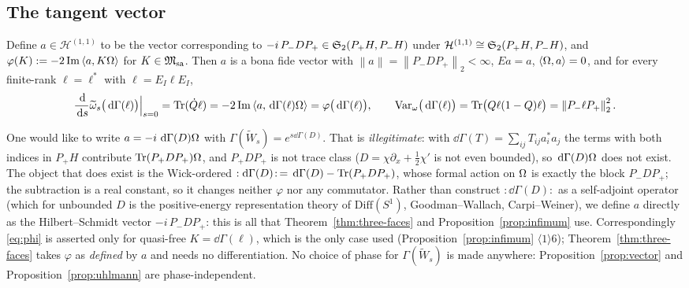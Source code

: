 \documentclass[11pt]{article}
\newcommand{\Pp}{P_+}\newcommand{\Pm}{P_-}
\newcommand{\Wt}{\widetilde W}\newcommand{\kt}{\widetilde k}
\newcommand{\Gm}{\Gamma}
\newcommand{\norm}[1]{\left\lVert #1\right\rVert}\newcommand{\abs}[1]{\left|#1\right|}
\newcommand{\ip}[2]{\left\langle #1,#2\right\rangle}\newcommand{\one}{\mathbf 1}
\newcommand{\Msa}{\cM_{\mathrm{sa}}}\newcommand{\Mpsa}{\cM'_{\mathrm{sa}}}
\begin{document}
\subsection{The tangent vector}
\begin{lemma}\label{lem:tangentvec}
Define $a\in\mathcal H^{(1,1)}$ to be the vector corresponding to $-i\,\Pm D\Pp\in
\Stwo(\Pp H,\Pm H)$ under $\mathcal H^{(1,1)}\cong\Stwo(\Pp H,\Pm H)$, and
$\varphi(K):=-2\operatorname{Im}\ip a{K\Om}$ for $K\in\Msa$.  Then $a$ is a bona fide vector with
$\norm a=\norm{\Pm D\Pp}_2<\infty$, $Ea=a$, $\ip\Om a=0$, and for every finite-rank $\ell=\ell^*$
with $\ell=E_I\ell E_I$,
\begin{equation}\label{eq:phi}
 \frac{\dd}{\dd s}\widetilde\omega_s\bigl(\dd\Gm(\ell)\bigr)\Big|_{s=0}
 =\Tr(\dot Q\ell)=-2\operatorname{Im}\ip a{\dd\Gm(\ell)\Om}=\varphi\bigl(\dd\Gm(\ell)\bigr),
 \qquad
 \Var_\omega\bigl(\dd\Gm(\ell)\bigr)=\Tr\bigl(Q\ell(1-Q)\ell\bigr)=\norm{\Pm\ell\Pp}_2^2 .
\end{equation}
\end{lemma}
\begin{remark}\label{rem:normalorder}
One would like to write $a=-i\,\dd\Gm(D)\Om$ with $\Gm(\Wt_s)=e^{s\dd\Gm(D)}$.  That is
\emph{illegitimate}: with $\dd\Gm(T)=\sum_{ij}T_{ij}a_i^*a_j$ the terms with both indices in $\Pp H$
contribute $\Tr(\Pp D\Pp)\Om$, and $\Pp D\Pp$ is not trace class ($D=\chi\partial_x+\frac12\chi'$ is
not even bounded), so $\dd\Gm(D)\Om$ does not exist.  The object that does exist is the
Wick-ordered $:\!\dd\Gm(D)\!:\,=\dd\Gm(D)-\Tr(\Pp D\Pp)$, whose formal action on $\Omega$ is exactly
the block $\Pm D\Pp$; the subtraction is a real constant, so it changes neither $\varphi$ nor any
commutator.  Rather than construct $:\!\dd\Gm(D)\!:$ as a self-adjoint operator (which for unbounded
$D$ is the positive-energy representation theory of $\mathrm{Diff}(S^1)$, Goodman--Wallach,
Carpi--Weiner), we define $a$ directly as the Hilbert--Schmidt vector $-i\,\Pm D\Pp$: this is all
that Theorem~\ref{thm:three-faces} and Proposition~\ref{prop:infimum} use.  Correspondingly
\eqref{eq:phi} is asserted only for quasi-free $K=\dd\Gm(\ell)$, which is the only case used
(Proposition~\ref{prop:infimum} $\langle1\rangle6$); Theorem~\ref{thm:three-faces} takes $\varphi$ as
\emph{defined} by $a$ and needs no differentiation.  No choice of phase for $\Gm(\Wt_s)$ is made
anywhere: Proposition~\ref{prop:vector} and Proposition~\ref{prop:uhlmann} are phase-independent.
\end{remark}
\end{document}

